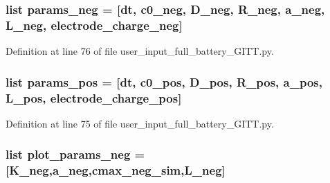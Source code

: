 \hypertarget{namespaceuser__input__full__battery___g_i_t_t_a0bd2f9c022b04c151ac8c0ad19eadd67}{
\subsubsection[{params\-\_\-neg}]{\setlength{\rightskip}{0pt plus 5cm}list params\-\_\-neg = \mbox{[}{\bf dt}, {\bf c0\-\_\-neg}, D\-\_\-neg, R\-\_\-neg, a\-\_\-neg, L\-\_\-neg, electrode\-\_\-charge\-\_\-neg\mbox{]}}}\label{namespaceuser__input__full__battery___g_i_t_t_a0bd2f9c022b04c151ac8c0ad19eadd67}


Definition at line 76 of file user\-\_\-input\-\_\-full\-\_\-battery\-\_\-\-G\-I\-T\-T.\-py.

\hypertarget{namespaceuser__input__full__battery___g_i_t_t_a51c49f845d3932a6a084187c90aab1ab}{
\subsubsection[{params\-\_\-pos}]{\setlength{\rightskip}{0pt plus 5cm}list params\-\_\-pos = \mbox{[}{\bf dt}, {\bf c0\-\_\-pos}, D\-\_\-pos, R\-\_\-pos, a\-\_\-pos, L\-\_\-pos, electrode\-\_\-charge\-\_\-pos\mbox{]}}}\label{namespaceuser__input__full__battery___g_i_t_t_a51c49f845d3932a6a084187c90aab1ab}


Definition at line 75 of file user\-\_\-input\-\_\-full\-\_\-battery\-\_\-\-G\-I\-T\-T.\-py.

\hypertarget{namespaceuser__input__full__battery___g_i_t_t_a0861e0e85d9d6139e0cc3cc1cc4fa692}{
\subsubsection[{plot\-\_\-params\-\_\-neg}]{\setlength{\rightskip}{0pt plus 5cm}list plot\-\_\-params\-\_\-neg = \mbox{[}{\bf K\-\_\-neg},a\-\_\-neg,{\bf cmax\-\_\-neg\-\_\-sim},L\-\_\-neg\mbox{]}}}\label{namespaceuser__input__full__battery___g_i_t_t_a0861e0e85d9d6139e0cc3cc1cc4fa692}


